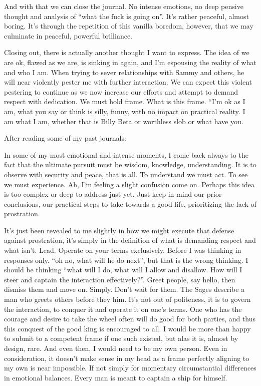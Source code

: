 \qquad And with that we can close the journal. No intense emotions, no
deep pensive thought and analysis of ``what the fuck is going on''. It's
rather peaceful, almost boring. It's through the repetition of this
vanilla boredom, however, that we may culminate in peaceful, powerful
brilliance.

\qquad Closing out, there is actually another thought I want to express.
The idea of we are ok, flawed as we are, is sinking in again, and I'm
espousing the reality of what and who I am. When trying to sever
relationships with Sammy and others, he will near violently pester me
with further interaction. We can expect this violent pestering to
continue as we now increase our efforts and attempt to demand respect
with dedication. We must hold frame. What is this frame. ``I'm ok as I
am, what you say or think is silly, funny, with no impact on practical
reality. I am what I am, whether that is Billy Beta or worthless slob or
what have you.

After reading some of my past journals:

In some of my most emotional and intense moments, I come back always to
the fact that the ultimate pursuit must be wisdom, knowledge,
understanding. It is to observe with security and peace, that is all. To
understand we must act. To see we must experience. Ah, I'm feeling a
slight confusion come on. Perhaps this idea is too complex or deep to
address just yet. Just keep in mind our prior conclusions, our practical
steps to take towards a good life, prioritizing the lack of prostration.

\qquad It's just been revealed to me slightly in how we might execute
that defense against prostration, it's simply in the definition of what
is demanding respect and what isn't. Lead. Operate on your terms
exclusively. Before I was thinking in responses only. ``oh no, what will
he do next'', but that is the wrong thinking. I should be thinking
``what will I do, what will I allow and disallow. How will I steer and
captain the interaction effectively?''. Greet people, say hello, then
dismiss them and move on. Simply. Don't wait for them. The Sages
describe a man who greets others before they him. It's not out of
politeness, it is to govern the interaction, to conquer it and operate
it on one's terms. One who has the courage and desire to take the wheel
often will do good for both parties, and thus this conquest of the good
king is encouraged to all. I would be more than happy to submit to a
competent frame if one such existed, but alas it is, almost by design,
rare. And even then, I would need to be my own person. Even in
consideration, it doesn't make sense in my head as a frame perfectly
aligning to my own is near impossible. If not simply for momentary
circumstantial differences in emotional balances. Every man is meant to
captain a ship for himself.

